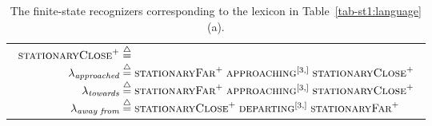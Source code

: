\begin{table}
{\begin{tabular}{@{}c@{}}
\begin{math}
\begin{array}[t]{r@{\;\define\;}l}
          \textsc{stationaryClose}\plus\\
          \lambda_{\textit{approached}} &
          \textsc{stationaryFar}\plus\;
          \textsc{approaching}\dagr\;
          \textsc{stationaryClose}\plus\\
          \lambda_{\textit{towards}} &
          \textsc{stationaryFar}\plus\;
          \textsc{approaching}\dagr\;
          \textsc{stationaryClose}\plus\\
          \lambda_{\textit{away from}} &
          \textsc{stationaryClose}\plus\;
          \textsc{departing}\dagr\;
          \textsc{stationaryFar}\plus
        \end{array}
      \end{math}
    \end{tabular}}
  \caption{The finite-state recognizers corresponding to the lexicon in
    Table~\protect\ref{tab-st1:language}(a).}
  \label{tab-st1:predicates}
\end{table}

